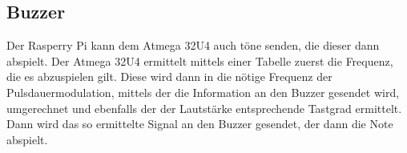 \documentclass[a4paper, 12pt]{article}
\begin{document}
\subsection*{Buzzer}
Der Rasperry Pi kann dem Atmega 32U4 auch töne senden, die dieser dann abspielt. Der Atmega 32U4 ermittelt mittels einer Tabelle zuerst die Frequenz, die es abzuspielen gilt. Diese wird dann in die nötige Frequenz der Pulsdauermodulation, mittels der die Information an den Buzzer gesendet wird, umgerechnet und ebenfalls der der Lautstärke entsprechende Tastgrad ermittelt. Dann wird das so ermittelte Signal an den Buzzer gesendet, der dann die Note abspielt.

\begin{landscape}
	\LARGE
	\hspace{-2.5cm}
	\resizebox{!}{\textheight}{
		
	}
\end{landscape}
	
\end{document}
